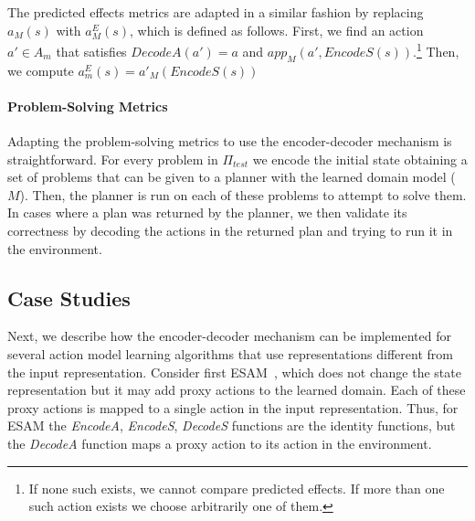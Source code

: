 \documentclass{article}
\theoremstyle{definition}
\theoremstyle{remark}
\newcommand{\ptest}{\ensuremath{\Pi_{\textit{test}}}\xspace}
\newcommand{\app}{\ensuremath{\textit{app}}\xspace}
\newcommand{\encodea}{\textit{EncodeA}\xspace}
\newcommand{\encodes}{\textit{EncodeS}\xspace}
\newcommand{\decodea}{\textit{DecodeA}\xspace}
\newcommand{\decodes}{\textit{DecodeS}\xspace}
\newif\ifaddcomments
\newcommand{\roni}[1]{\ifaddcomments{\textcolor{red}{[Roni: #1]}}\fi}
\begin{document}
The predicted effects metrics are adapted in a similar fashion
by replacing $a_M(s)$ with $a^E_M(s)$, which is defined as follows. 
First, we find an action $a'\in A_m$ that satisfies $\decodea(a')=a$ and 
$\app_M(a',\encodes(s))$.\footnote{If none such exists, we cannot compare predicted effects. If more than one such action exists we choose arbitrarily one of them.} 
Then, we compute $a^E_m(s)=a'_M(\encodes(s))$

\roni{Would be great if someone would add an example of this.}

\paragraph{Problem-Solving Metrics}

Adapting the problem-solving metrics to use the encoder-decoder mechanism is straightforward. 
For every problem in \ptest we encode the initial state obtaining a set of problems that can be given to a planner with the learned domain model ($M$). 
Then, the planner is run on each of these problems to attempt to solve them.
In cases where a plan was returned by the planner, we then validate its correctness by decoding the actions in the returned plan and trying to run it in the environment. 






\subsection{Case Studies}
Next, we describe how the encoder-decoder mechanism can be implemented for several action model learning algorithms that use representations different from the input representation. 
Consider first ESAM~\citep{juba2021safe}, which does not change the state representation but it may add proxy actions to the learned domain. 
Each of these proxy actions is mapped to a single action in the input representation. 
Thus, for ESAM the \encodea, \encodes, \decodes functions are the identity functions, but the \decodea function maps a proxy action to its action in the environment. 
\end{document}

